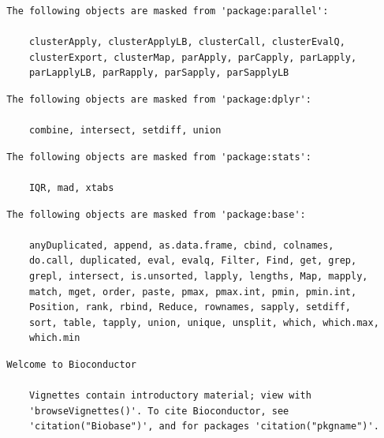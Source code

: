 \documentclass[12pt,twoside]{reedthesis}
\begin{document}
  \begin{verbatim}
  The following objects are masked from 'package:parallel':
  
      clusterApply, clusterApplyLB, clusterCall, clusterEvalQ,
      clusterExport, clusterMap, parApply, parCapply, parLapply,
      parLapplyLB, parRapply, parSapply, parSapplyLB
  \end{verbatim}
  
  \begin{verbatim}
  The following objects are masked from 'package:dplyr':
  
      combine, intersect, setdiff, union
  \end{verbatim}
  
  \begin{verbatim}
  The following objects are masked from 'package:stats':
  
      IQR, mad, xtabs
  \end{verbatim}
  
  \begin{verbatim}
  The following objects are masked from 'package:base':
  
      anyDuplicated, append, as.data.frame, cbind, colnames,
      do.call, duplicated, eval, evalq, Filter, Find, get, grep,
      grepl, intersect, is.unsorted, lapply, lengths, Map, mapply,
      match, mget, order, paste, pmax, pmax.int, pmin, pmin.int,
      Position, rank, rbind, Reduce, rownames, sapply, setdiff,
      sort, table, tapply, union, unique, unsplit, which, which.max,
      which.min
  \end{verbatim}
  
  \begin{verbatim}
  Welcome to Bioconductor
  
      Vignettes contain introductory material; view with
      'browseVignettes()'. To cite Bioconductor, see
      'citation("Biobase")', and for packages 'citation("pkgname")'.
  \end{verbatim}
  
  \begin{Shaded}
  \begin{Highlighting}[]
  \NormalTok{()}
  \end{Highlighting}
  \end{Shaded}
  
\end{document}
